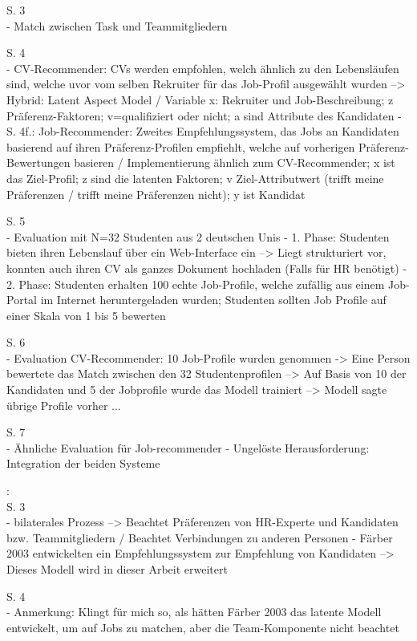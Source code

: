 S. 3\\
- Match zwischen Task und Teammitgliedern

S. 4\\
- CV-Recommender: CVs werden empfohlen, welch ähnlich zu den Lebensläufen sind, welche uvor vom selben Rekruiter für das Job-Profil ausgewählt wurden --> Hybrid: Latent Aspect Model / Variable x: Rekruiter und Job-Beschreibung; z Präferenz-Faktoren; v=qualifiziert oder nicht; a sind Attribute des Kandidaten
- S. 4f.: Job-Recommender: Zweites Empfehlungssystem, das Jobs an Kandidaten basierend auf ihren Präferenz-Profilen empfiehlt, welche auf vorherigen Präferenz-Bewertungen basieren / Implementierung ähnlich zum CV-Recommender; x ist das Ziel-Profil; z sind die latenten Faktoren; v Ziel-Attributwert (trifft meine Präferenzen / trifft meine Präferenzen nicht); y ist Kandidat

S. 5\\
- Evaluation mit N=32 Studenten aus 2 deutschen Unis
- 1. Phase: Studenten bieten ihren Lebenslauf über ein Web-Interface ein --> Liegt strukturiert vor, konnten auch ihren CV als ganzes Dokument hochladen (Falls für HR benötigt)
- 2. Phase: Studenten erhalten 100 echte Job-Profile, welche zufällig aus einem Job-Portal im Internet heruntergeladen wurden; Studenten sollten Job Profile auf einer Skala von 1 bis 5 bewerten

S. 6\\
- Evaluation CV-Recommender: 10 Job-Profile wurden genommen -> Eine Person bewertete das Match zwischen den 32 Studentenprofilen --> Auf Basis von 10 der Kandidaten und 5 der Jobprofile wurde das Modell trainiert --> Modell sagte übrige Profile vorher ...

S. 7\\
- Ähnliche Evaluation für Job-recommender
- Ungelöste Herausforderung: Integration der beiden Systeme

\textcite{malinowski:2005}:\\
S. 3\\
- bilaterales Prozess --> Beachtet Präferenzen von HR-Experte und Kandidaten bzw. Teammitgliedern / Beachtet Verbindungen zu anderen Personen
- Färber 2003 entwickelten ein Empfehlungssystem zur Empfehlung von Kandidaten --> Dieses Modell wird in dieser Arbeit erweitert

S. 4\\
- Anmerkung: Klingt für mich so, als hätten Färber 2003 das latente Modell entwickelt, um auf Jobs zu matchen, aber die Team-Komponente nicht beachtet

